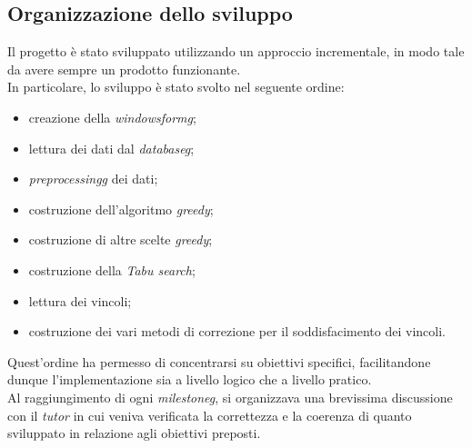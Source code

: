 \subsection{Organizzazione dello sviluppo}
\label{sec:organizzazione-sviluppo}
\noindent Il progetto è stato sviluppato utilizzando
un approccio incrementale, in modo tale da avere
sempre un prodotto funzionante.\\
In particolare, lo sviluppo è stato svolto nel seguente ordine:
\begin{itemize}
    \item creazione della \textit{\gls{windowsformg}};
    \item lettura dei dati dal \textit{\gls{databaseg}};
    \item \textit{\gls{preprocessingg}} dei dati;
    \item costruzione dell'algoritmo \textit{greedy};
    \item costruzione di altre scelte \textit{greedy};
    \item costruzione della \textit{Tabu search};
    \item lettura dei vincoli;
    \item costruzione dei vari metodi di correzione
    per il soddisfacimento dei vincoli.
\end{itemize}

\noindent Quest'ordine ha permesso di concentrarsi su obiettivi specifici,
facilitandone dunque l'implementazione sia a livello logico che a livello pratico.\\

\noindent Al raggiungimento di ogni \textit{\gls{milestoneg}}, si
organizzava una brevissima discussione con il \textit{tutor}
in cui veniva verificata la correttezza e la coerenza di quanto
sviluppato in relazione agli obiettivi preposti.
